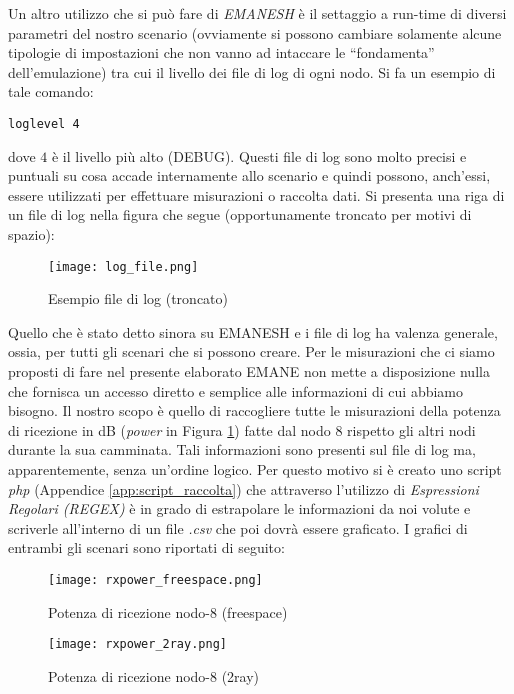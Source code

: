 Un altro utilizzo che si può fare di \textit{EMANESH} è il settaggio a run-time di diversi parametri del nostro scenario (ovviamente si possono cambiare solamente alcune tipologie di impostazioni che non vanno ad intaccare le ``fondamenta'' dell'emulazione) tra cui il livello dei file di log di ogni nodo. Si fa un esempio di tale comando:
\begin{verbatim}
loglevel 4
\end{verbatim}
dove $4$ è il livello più alto (DEBUG). Questi file di log sono molto precisi e puntuali su cosa accade internamente allo scenario e quindi possono, anch'essi, essere utilizzati per effettuare misurazioni o raccolta dati. Si presenta una riga di un file di log nella figura che segue (opportunamente troncato per motivi di spazio): 

\begin{figure}[H]
	\centering
	\texttt{[image: log\_file.png]}
	\caption{Esempio file di log (troncato)}
	\label{fig:log_file}
\end{figure}

Quello che è stato detto sinora su EMANESH e i file di log ha valenza generale, ossia, per tutti gli scenari che si possono creare. Per le misurazioni che ci siamo proposti di fare nel presente elaborato EMANE non mette a disposizione nulla che fornisca un accesso diretto e semplice alle informazioni di cui abbiamo bisogno. Il nostro scopo è quello di raccogliere tutte le misurazioni della potenza di ricezione in dB (\textit{power} in Figura \ref{fig:log_file}) fatte dal nodo $8$ rispetto gli altri nodi durante la sua camminata. Tali informazioni sono presenti sul file di log ma, apparentemente, senza un'ordine logico. Per questo motivo si è creato uno script \textit{php} (Appendice \ref{app:script_raccolta}) che attraverso l'utilizzo di \textit{Espressioni Regolari (REGEX)} è in grado di estrapolare le informazioni da noi volute e scriverle all'interno di un file \textit{.csv} che poi dovrà essere graficato. I grafici di entrambi gli scenari sono riportati di seguito:

\begin{figure}[H]
	\centering
	\texttt{[image: rxpower\_freespace.png]}
	\caption{Potenza di ricezione nodo-8 (freespace)}
	\label{fig:rxpower_freespace}
\end{figure}

\begin{figure}[H]
	\centering
	\texttt{[image: rxpower\_2ray.png]}
	\caption{Potenza di ricezione nodo-8 (2ray)}
	\label{fig:rxpower_2ray}
\end{figure}

